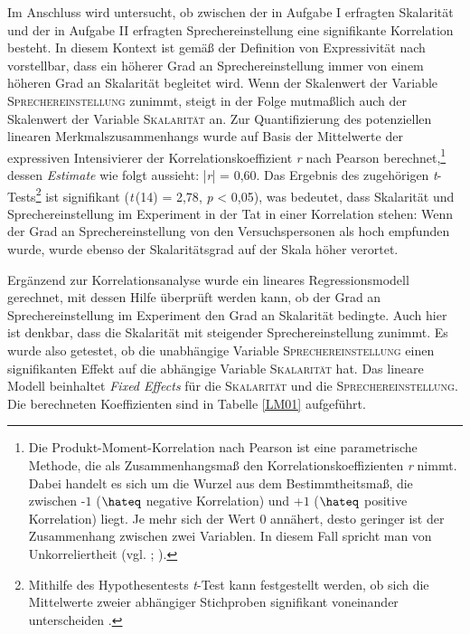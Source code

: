 Im Anschluss wird untersucht, ob zwischen der in Aufgabe I erfragten Skalarität und der in Aufgabe II erfragten Sprechereinstellung eine signifikante Korrelation besteht. In diesem Kontext ist gemäß der Definition von Expressivität nach \citet[133]{Gutzmann.2019a} vorstellbar, dass ein höherer Grad an Sprechereinstellung immer von einem höheren Grad an Skalarität begleitet wird. Wenn der Skalenwert der Variable \textsc{Sprechereinstellung} zunimmt, steigt in der Folge mutmaßlich auch der Skalenwert der Variable \textsc{Skalarität} an. Zur Quantifizierung des potenziellen linearen Merkmalszusammenhangs  wurde auf Basis der Mittelwerte der expressiven Intensivierer der Korrelationskoeffizient \textit{r} nach Pearson berechnet,\footnote{Die Produkt-Moment-Korrelation nach Pearson ist eine parametrische Methode, die als Zusammenhangsmaß den Korrelationskoeffizienten \textit{r} nimmt. Dabei handelt es sich um die Wurzel aus dem Bestimmtheitsmaß, die zwischen -$1$ ($\hateq$ negative Korrelation) und +$1$ {($\hateq$ positive Korrelation)} liegt. Je mehr sich der Wert $0$ annähert, desto geringer ist der Zusammenhang zwischen zwei Variablen. In diesem Fall spricht man von Unkorreliertheit (vgl. {\citealt[128ff.]{Mittag.2016}}; \citealt[89]{Winter.2020}).} dessen \textit{Estimate} wie folgt aussieht: {|\textit{r}| = 0,60}. Das Ergebnis des zugehörigen \textit{t}-Tests\footnote{Mithilfe des Hypothesentests \textit{t}-Test kann festgestellt werden, ob sich die Mittelwerte zweier abhängiger Stichproben signifikant voneinander unterscheiden \citep[vgl.][280f.]{Sauer.2019}.} ist signifikant ({\textit{t}\,(14) = 2,78}, \textit{p} < 0,05), was bedeutet, dass Skalarität und Sprechereinstellung im Experiment in der Tat in einer Korrelation stehen: Wenn der Grad an Sprechereinstellung von den Versuchspersonen als hoch empfunden wurde, wurde ebenso der Skalaritätsgrad auf der Skala höher verortet.


Ergänzend zur Korrelationsanalyse wurde ein lineares Regressionsmodell gerechnet, mit dessen Hilfe überprüft werden kann, ob der Grad an Sprechereinstellung im Experiment den Grad an Skalarität bedingte. Auch hier ist denkbar, dass die Skalarität mit steigender Sprechereinstellung zunimmt. Es wurde also getestet, ob die unabhängige Variable \textsc{Sprechereinstellung} einen signifikanten Effekt auf die abhängige Variable \textsc{Skalarität} hat. Das lineare Modell beinhaltet \textit{Fixed Effects} für die \textsc{Skalarität} und die \textsc{Sprechereinstellung}. Die berechneten Koeffizienten sind in {Tabelle \ref{LM01}} aufgeführt.


